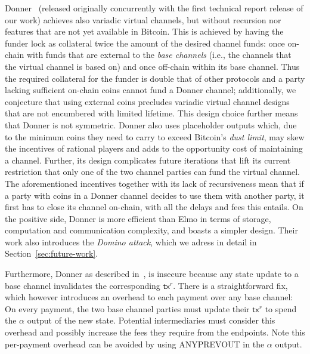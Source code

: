   Donner~\cite{donner}
    (released originally concurrently with the first technical report release of our work) 
achieves also variadic
  virtual channels, but without recursion nor features that are not yet
  available in Bitcoin. This is achieved by having the funder lock as
  collateral twice the amount of the desired channel funds: once on-chain with
  funds that are external to the \emph{base channels} (i.e., the channels that the
  virtual channel is based on) and once off-chain within its base channel. Thus
  the required collateral for the funder is double that of other protocols and
  a party lacking sufficient on-chain coins cannot fund a Donner channel;
  additionally, we conjecture that using external coins precludes variadic
  virtual channel designs that are not encumbered with limited lifetime. This
  design choice further means that Donner is not symmetric. Donner also uses
  placeholder outputs which, due to the minimum coins they need to carry to
  exceed Bitcoin's \emph{dust limit}, may skew the incentives of rational players
  and adds to the
  opportunity cost of maintaining a channel. Further, its design complicates
  future iterations that lift its current restriction that only one of the two
  channel parties can fund the virtual channel. The aforementioned incentives
  together with its lack of recursiveness mean that if a party with coins in a
  Donner channel decides to use them with another party, it first has to close
  its channel on-chain, with all the delays and fees this entails.
  On the positive side, Donner is
  more efficient than Elmo in terms of storage, computation and communication
  complexity, and boasts a simpler design. 
  Their work also introduces the \emph{Domino attack},
  which we adress in detail in Section~\ref{sec:future-work}.

  Furthermore,  Donner as described in~\cite{donner}, 
  is insecure because any state update to a base
  channel invalidates the corresponding $\mathsf{tx}^r$. There is a
  straightforward fix, which however introduces an overhead to each payment over
  any base channel: On every payment, the two base channel parties must update
  their $\mathsf{tx}^r$ to spend the $\alpha$ output of the new state. Potential
  intermediaries must consider this overhead and possibly increase the fees they
  require from the endpoints. Note this per-payment overhead can be avoided by using
  ANYPREVOUT in the $\alpha$ output.

